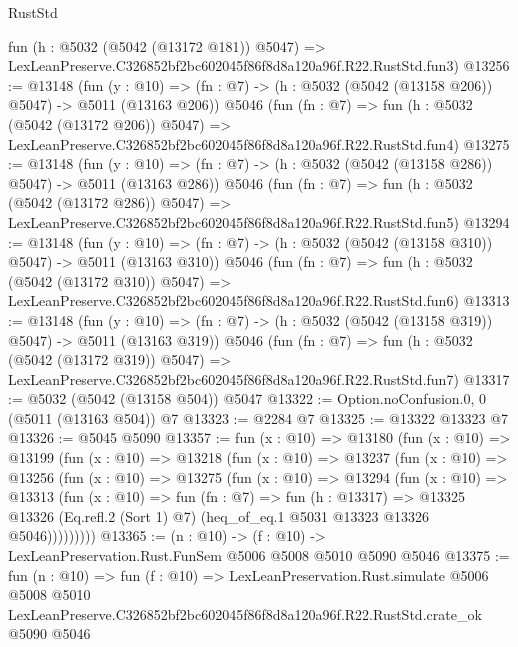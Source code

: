 \begin{lexlean}{RustStd}
\begin{coremodule}
    fun (h : @5032 (@5042 (@13172 @181)) @5047) =>
    LexLeanPreserve.C326852bf2bc602045f86f8d8a120a96f.R22.RustStd.fun3)
@13256 := @13148
    (fun (y : @10) => (fn : @7) -> (h : @5032 (@5042 (@13158 @206)) @5047) -> @5011 (@13163 @206))
    @5046
    (fun (fn : @7) =>
    fun (h : @5032 (@5042 (@13172 @206)) @5047) =>
    LexLeanPreserve.C326852bf2bc602045f86f8d8a120a96f.R22.RustStd.fun4)
@13275 := @13148
    (fun (y : @10) => (fn : @7) -> (h : @5032 (@5042 (@13158 @286)) @5047) -> @5011 (@13163 @286))
    @5046
    (fun (fn : @7) =>
    fun (h : @5032 (@5042 (@13172 @286)) @5047) =>
    LexLeanPreserve.C326852bf2bc602045f86f8d8a120a96f.R22.RustStd.fun5)
@13294 := @13148
    (fun (y : @10) => (fn : @7) -> (h : @5032 (@5042 (@13158 @310)) @5047) -> @5011 (@13163 @310))
    @5046
    (fun (fn : @7) =>
    fun (h : @5032 (@5042 (@13172 @310)) @5047) =>
    LexLeanPreserve.C326852bf2bc602045f86f8d8a120a96f.R22.RustStd.fun6)
@13313 := @13148
    (fun (y : @10) => (fn : @7) -> (h : @5032 (@5042 (@13158 @319)) @5047) -> @5011 (@13163 @319))
    @5046
    (fun (fn : @7) =>
    fun (h : @5032 (@5042 (@13172 @319)) @5047) =>
    LexLeanPreserve.C326852bf2bc602045f86f8d8a120a96f.R22.RustStd.fun7)
@13317 := @5032 (@5042 (@13158 @504)) @5047
@13322 := Option.noConfusion.{0, 0} (@5011 (@13163 @504)) @7
@13323 := @2284 @7
@13325 := @13322 @13323 @7
@13326 := @5045 @5090
@13357 := fun (x : @10) =>
  @13180
    (fun (x : @10) =>
    @13199
      (fun (x : @10) =>
      @13218
        (fun (x : @10) =>
        @13237
          (fun (x : @10) =>
          @13256
            (fun (x : @10) =>
            @13275
              (fun (x : @10) =>
              @13294
                (fun (x : @10) =>
                @13313
                  (fun (x : @10) =>
                  fun (fn : @7) =>
                  fun (h : @13317) =>
                  @13325
                    @13326
                    (Eq.refl.{2} (Sort 1) @7)
                    (heq_of_eq.{1} @5031 @13323 @13326 @5046)))))))))
@13365 := (n : @10) -> (f : @10) -> LexLeanPreservation.Rust.FunSem @5006 @5008 @5010 @5090 @5046
@13375 := fun (n : @10) =>
  fun (f : @10) =>
  LexLeanPreservation.Rust.simulate
    @5006
    @5008
    @5010
    LexLeanPreserve.C326852bf2bc602045f86f8d8a120a96f.R22.RustStd.crate_ok
    @5090
    @5046
\end{coremodule}
\end{lexlean}
